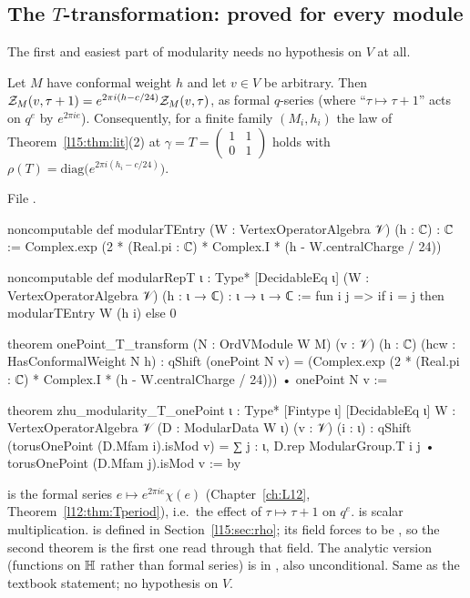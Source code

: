 \subsection{The \texorpdfstring{$T$}{T}-transformation: proved for every module}

The first and easiest part of modularity needs no hypothesis on $V$ at all.

\begin{theorem}\label{l15:thm:T}
Let $M$ have conformal weight $h$ and let $v\in V$ be arbitrary. Then
$\mathcal{Z}_M(v,\tau+1)=e^{2\pi i(h-c/24)}\mathcal{Z}_M(v,\tau)$, as formal $q$-series (where ``$\tau\mapsto\tau+1$'' acts on
$q^e$ by $e^{2\pi i e}$). Consequently, for a finite family $(M_i,h_i)$ the law of Theorem~\ref{l15:thm:lit}(2) at
$\gamma=T=\left(\begin{smallmatrix}1&1\\0&1\end{smallmatrix}\right)$ holds with $\rho(T)=\mathrm{diag}\bigl(e^{2\pi i(h_i-c/24)}\bigr)$.
\end{theorem}
\noindent File .
\begin{leancode}
noncomputable def modularTEntry (W : VertexOperatorAlgebra 𝒱) (h : ℂ) : ℂ :=
  Complex.exp (2 * (Real.pi : ℂ) * Complex.I * (h - W.centralCharge / 24))

noncomputable def modularRepT {ι : Type*} [DecidableEq ι] (W : VertexOperatorAlgebra 𝒱)
    (h : ι → ℂ) : ι → ι → ℂ :=
  fun i j => if i = j then modularTEntry W (h i) else 0

theorem onePoint_T_transform (N : OrdVModule W M) (v : 𝒱) (h : ℂ) (hcw : HasConformalWeight N h) :
    qShift (onePoint N v)
      = (Complex.exp (2 * (Real.pi : ℂ) * Complex.I * (h - W.centralCharge / 24)))
          • onePoint N v :=

theorem zhu_modularity_T_onePoint {ι : Type*} [Fintype ι] [DecidableEq ι]
    {W : VertexOperatorAlgebra 𝒱} (D : ModularData W ι) (v : 𝒱) (i : ι) :
    qShift (torusOnePoint (D.Mfam i).isMod v)
      = ∑ j : ι, D.rep ModularGroup.T i j • torusOnePoint (D.Mfam j).isMod v := by
\end{leancode}

\begin{dictionary}
 is the formal series $e\mapsto e^{2\pi ie}\chi(e)$ (Chapter~\ref{ch:L12}, Theorem~\ref{l12:thm:Tperiod}),
i.e.\ the effect of $\tau\mapsto\tau+1$ on $q^e$.  is scalar multiplication.  is defined in
Section~\ref{l15:sec:rho}; its field  forces  to be , so the second
theorem is the first one read through that field. The analytic version (functions on $\mathbb{H}$ rather than formal
series) is \allowbreak{} in , also unconditional. Same as the
textbook statement; no hypothesis on $V$.
\end{dictionary}

